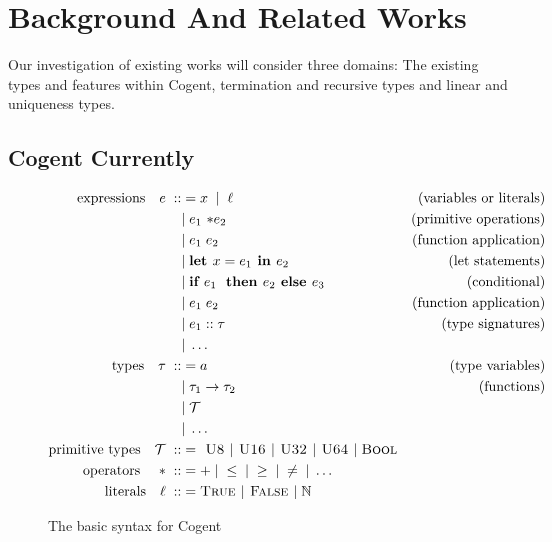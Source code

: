 \chapter{Background And Related Works}\label{ch:background}


Our investigation of existing works will consider three domains: The existing types and features
within Cogent, termination and recursive types and linear and uniqueness types.

\section{Cogent Currently}

\begin{figure}
    \centering

    \begin{align*}
    \text{expressions}\quad e\; ::&= x\;\; |\;\; \ell & \text{(variables or literals)} \\
                &|\; e_1 \text{ \textasteriskcentered } e_2 & \text{(primitive operations)} \\
                &|\; e_1\; e_2 & \text{(function application)} \\
                &|\; \textbf{let } x = e_1 \textbf{ in } e_2 & \text{(let statements)} \\
                &|\; \textbf{if } e_1\; \textbf{ then } e_2 \textbf{ else } e_3 & \text{(conditional)} \\
                &|\; e_1\; e_2 & \text{(function application)} \\
                &|\; e_1 :: \tau & \text{(type signatures)} \\
                &|\; \dots \\
        \text{types}\quad \tau\; ::&= a & \text{(type variables)} \\
              &|\; \tau_1 \rightarrow \tau_2 & \text{(functions)} \\
              &|\; \mathcal{T} \\
              &|\; \dots \\
        \text{primitive types}\quad \mathcal{T}\; ::&= \textsc{ U8 } | \textsc{ U16 } | \textsc{ U32 } | \textsc{ U64 } |\; \textsc{Bool} \\
        \text{operators \ \ \ \textasteriskcentered }\; ::&= +\; |\; \leq\; |\; \geq\; |\; \neq\; |\; \dots \\
        \text{literals}\quad \ell\; ::&= \textsc{True } | \textsc{ False } |\; \mathbb{N}  \\
    \end{align*}

    \caption{The basic syntax for Cogent~\citep{ICFPCogent}}
    \label{fig:cogentGrammar}
\end{figure}

